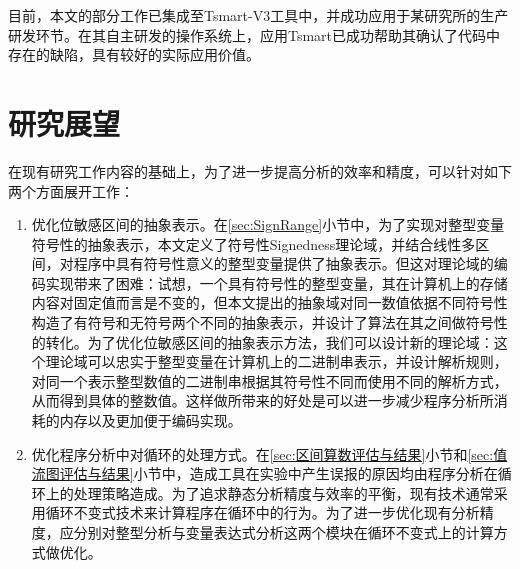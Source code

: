 目前，本文的部分工作已集成至Tsmart-V3工具中，并成功应用于某研究所的生产研发环节。在其自主研发的操作系统上，应用Tsmart已成功帮助其确认了代码中存在的缺陷，具有较好的实际应用价值。

\section{研究展望}

在现有研究工作内容的基础上，为了进一步提高分析的效率和精度，可以针对如下两个方面展开工作：

\begin{enumerate}
	\item 优化位敏感区间的抽象表示。在\ref{sec:SignRange}小节中，为了实现对整型变量符号性的抽象表示，本文定义了符号性Signedness理论域，并结合线性多区间，对程序中具有符号性意义的整型变量提供了抽象表示。但这对理论域的编码实现带来了困难：试想，一个具有符号性的整型变量，其在计算机上的存储内容对固定值而言是不变的，但本文提出的抽象域对同一数值依据不同符号性构造了有符号和无符号两个不同的抽象表示，并设计了算法在其之间做符号性的转化。为了优化位敏感区间的抽象表示方法，我们可以设计新的理论域：这个理论域可以忠实于整型变量在计算机上的二进制串表示，并设计解析规则，对同一个表示整型数值的二进制串根据其符号性不同而使用不同的解析方式，从而得到具体的整数值。这样做所带来的好处是可以进一步减少程序分析所消耗的内存以及更加便于编码实现。
	
	\item 优化程序分析中对循环的处理方式。在\ref{sec:区间算数评估与结果}小节和\ref{sec:值流图评估与结果}小节中，造成工具在实验中产生误报的原因均由程序分析在循环上的处理策略造成。为了追求静态分析精度与效率的平衡，现有技术通常采用循环不变式技术来计算程序在循环中的行为。为了进一步优化现有分析精度，应分别对整型分析与变量表达式分析这两个模块在循环不变式上的计算方式做优化。
\end{enumerate}


